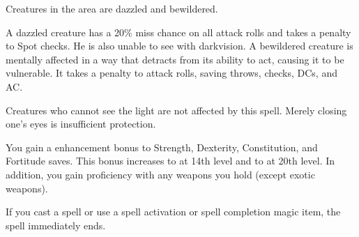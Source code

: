 \begin{spelleffect}
  Creatures in the area are dazzled and bewildered.
\end{spelleffect}
\begin{spellnotes}
  A dazzled creature has a 20\% miss chance on all attack rolls and takes a  penalty to Spot checks. He is also unable to see with darkvision. A bewildered creature is mentally affected in a way that detracts from its ability to act, causing it to be vulnerable. It takes a  penalty to attack rolls, saving throws, checks, DCs, and AC.

  Creatures who cannot see the light are not affected by this spell. Merely closing one's eyes is insufficient protection.
\end{spellnotes}

\spellrng{\rngpers}
\begin{spelleffect}
  You gain a  enhancement bonus to Strength, Dexterity, Constitution, and Fortitude saves. This bonus increases to  at 14th level and to  at 20th level. In addition, you gain proficiency with any weapons you hold (except exotic weapons).
\end{spelleffect}
\begin{spellnotes}
  If you cast a spell or use a spell activation or spell completion magic item, the spell immediately ends.
\end{spellnotes}

